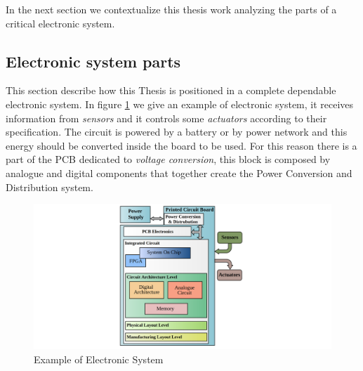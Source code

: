 {{{			In the next section we contextualize this thesis work analyzing the parts of a critical electronic system.
		} %
	
	
		\subsection{Electronic system parts}{
			This section describe how this Thesis is positioned in a complete dependable electronic system.
			In figure \ref{fig:ElectronicSystemParts} we give an example of electronic system, it receives information from \textit{sensors} and it controls some \textit{actuators} according to their specification. The circuit is powered by a battery or by power network and this energy should be converted inside the board to be used. For this reason there is a part of the PCB dedicated to \textit{voltage conversion}, this block is composed by analogue and digital components that together create the Power Conversion and Distribution system.
			
			\begin{figure}[H]
				\centering
				\includegraphics[scale=0.26,center]{./images/ElectronicSystemParts.png}
				\caption{Example of Electronic System}
				\label{fig:ElectronicSystemParts}
			\end{figure} 
			
}}}
